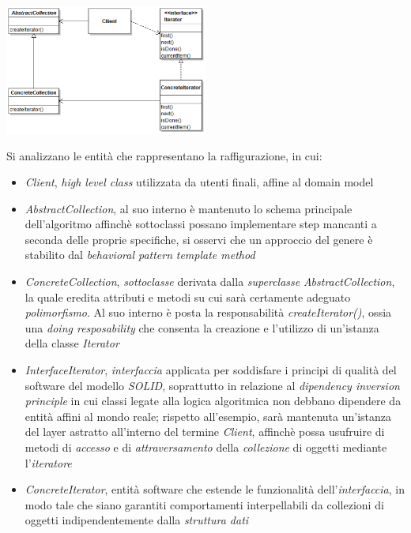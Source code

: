 \documentclass{article}
\begin{document}
\begin{center}
    \includegraphics[width=0.5\textwidth]{foto 1.png}
\end{center}
Si analizzano le entità che rappresentano la raffigurazione, in cui:
\begin{itemize}[label={-}]
    \itemsep0em
    \item \textit{Client}, \textit{high level class} utilizzata da utenti finali, affine al domain model
    \item \textit{AbstractCollection}, al suo interno è mantenuto lo schema principale dell'algoritmo affinchè sottoclassi possano implementare step mancanti a seconda delle proprie specifiche, si osservi che un approccio del genere è stabilito dal \textit{behavioral pattern} \textit{template method}
    \item \textit{ConcreteCollection}, \textit{sottoclasse} derivata dalla \textit{superclasse} \textit{AbstractCollection}, la quale eredita attributi e metodi su cui sarà certamente adeguato \textit{polimorfismo}. Al suo interno è posta la responsabilità \textit{createIterator()}, ossia una \textit{doing resposability} che consenta la creazione e l'utilizzo di un'istanza della classe \textit{Iterator}
    \item \textit{InterfaceIterator}, \textit{interfaccia} applicata per soddisfare i principi di qualità del software del modello \textit{SOLID}, soprattutto in relazione al \textit{dipendency inversion principle} in cui classi legate alla logica algoritmica non debbano dipendere da entità affini al mondo reale; rispetto all'esempio, sarà mantenuta un'istanza del layer astratto all'interno del termine \textit{Client}, affinchè possa usufruire di metodi di \textit{accesso} e di \textit{attraversamento} della \textit{collezione} di oggetti mediante l'\textit{iteratore} 
    \item \textit{ConcreteIterator}, entità software che estende le funzionalità dell'\textit{interfaccia}, in modo tale che siano garantiti comportamenti interpellabili da collezioni di oggetti indipendentemente dalla \textit{struttura dati }
\end{itemize}
\end{document}
